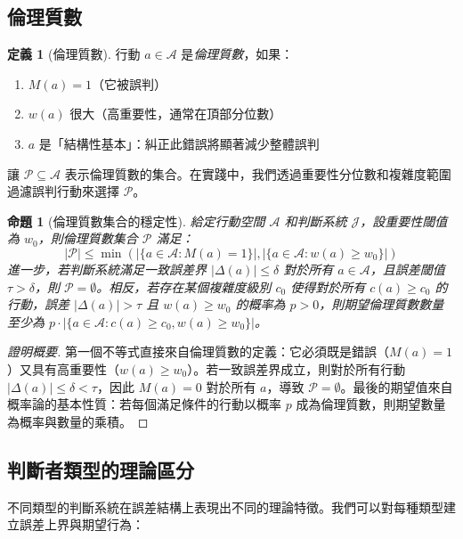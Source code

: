\documentclass[12pt,a4paper]{article}
\newtheorem{proposition}[theorem]{命題}
\theoremstyle{definition}
\newtheorem{definition}[theorem]{定義}
\theoremstyle{remark}
\begin{document}
\subsection{倫理質數}

\begin{definition}[倫理質數]
行動 $a \in \mathcal{A}$ 是\emph{倫理質數}，如果：
\begin{enumerate}
    \item $M(a) = 1$（它被誤判）
    \item $w(a)$ 很大（高重要性，通常在頂部分位數）
    \item $a$ 是「結構性基本」：糾正此錯誤將顯著減少整體誤判
\end{enumerate}
\end{definition}

讓 $\mathcal{P} \subseteq \mathcal{A}$ 表示倫理質數的集合。在實踐中，我們透過重要性分位數和複雜度範圍過濾誤判行動來選擇 $\mathcal{P}$。

\begin{proposition}[倫理質數集合的穩定性]
\label{prop:prime_stability}
給定行動空間 $\mathcal{A}$ 和判斷系統 $\mathcal{J}$，設重要性閾值為 $w_0$，則倫理質數集合 $\mathcal{P}$ 滿足：
\[
|\mathcal{P}| \leq \min\left(|\{a \in \mathcal{A} : M(a) = 1\}|, |\{a \in \mathcal{A} : w(a) \geq w_0\}|\right)
\]
進一步，若判斷系統滿足一致誤差界 $|\Delta(a)| \leq \delta$ 對於所有 $a \in \mathcal{A}$，且誤差閾值 $\tau > \delta$，則 $\mathcal{P} = \emptyset$。相反，若存在某個複雜度級別 $c_0$ 使得對於所有 $c(a) \geq c_0$ 的行動，誤差 $|\Delta(a)| > \tau$ 且 $w(a) \geq w_0$ 的概率為 $p > 0$，則期望倫理質數數量至少為 $p \cdot |\{a \in \mathcal{A} : c(a) \geq c_0, w(a) \geq w_0\}|$。
\end{proposition}

\begin{proof}[證明概要]
第一個不等式直接來自倫理質數的定義：它必須既是錯誤（$M(a) = 1$）又具有高重要性（$w(a) \geq w_0$）。若一致誤差界成立，則對於所有行動 $|\Delta(a)| \leq \delta < \tau$，因此 $M(a) = 0$ 對於所有 $a$，導致 $\mathcal{P} = \emptyset$。最後的期望值來自概率論的基本性質：若每個滿足條件的行動以概率 $p$ 成為倫理質數，則期望數量為概率與數量的乘積。
\end{proof}

\subsection{判斷者類型的理論區分}

不同類型的判斷系統在誤差結構上表現出不同的理論特徵。我們可以對每種類型建立誤差上界與期望行為：
\end{document}
